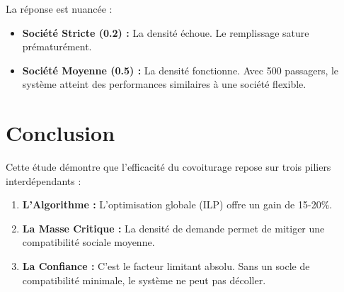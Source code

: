 \documentclass[a4paper,12pt]{article}
\begin{document}
La réponse est nuancée :
\begin{itemize}
    \item \textbf{Société Stricte (0.2) :} La densité échoue. Le remplissage sature prématurément.
    \item \textbf{Société Moyenne (0.5) :} La densité fonctionne. Avec 500 passagers, le système atteint des performances similaires à une société flexible.
\end{itemize}

\section{Conclusion}
Cette étude démontre que l'efficacité du covoiturage repose sur trois piliers interdépendants :
\begin{enumerate}
    \item \textbf{L'Algorithme :} L'optimisation globale (ILP) offre un gain de 15-20\%.
    \item \textbf{La Masse Critique :} La densité de demande permet de mitiger une compatibilité sociale moyenne.
    \item \textbf{La Confiance :} C'est le facteur limitant absolu. Sans un socle de compatibilité minimale, le système ne peut pas décoller.
\end{enumerate}
\end{document}
